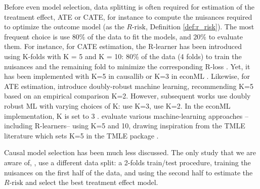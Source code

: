 \documentclass[a4paper,num-refs]{oup-contemporary}%
\begin{document}
Before even model selection, data splitting is often required for
estimation of the treatment effect, ATE or CATE, for instance to compute
the nuisances required to optimize the outcome model (as the
$R\text{-risk}$, Definition \ref{def:r_risk}).
%
The most frequent choice is use 80\% of the data to fit the models,
and 20\% to evaluate them.
%
For instance, for CATE estimation, the R-learner has been introduced using K-folds with K = 5
and K = 10: 80\% of the data (4 folds) to train the nuisances and the remaining
fold to minimize the corresponding R-loss \cite{nie_quasioracle_2017}.
Yet, it has been implemented with K=5 in causallib
\cite{causalevaluations} or K=3 in econML \cite{econml}.
Likewise, for ATE estimation, \cite{chernozhukov_double_2018}
introduce doubly-robust machine learning,
recommending K=5 based on an empirical comparison K=2. However,
subsequent works use doubly robust ML with varying choices
of K: \cite{loiseau_external_2022} use K=3, \cite{gao_assessment_2021} use
K=2. In the econML implementation, K is set to 3 \cite{econml}.
\cite{naimi2021challenges} evaluate various machine-learning approaches
--including R-learners-- using K=5 and 10, drawing inspiration from the
TMLE literature which sets
K=5 in the TMLE package \cite{tmle_package_2012}.

Causal model selection has been much less discussed. The only study that
we are aware of, \cite{schuler_comparison_2018}, use a different data
split: a 2-folds train/test procedure,
training the nuisances on the first half of the data, and using the
second half to estimate the $R\text{-risk}$ and select the best treatment
effect model.



\end{document}
